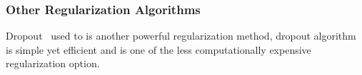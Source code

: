 \subsubsection{Other Regularization Algorithms}

Dropout~\cite{JMLR:v15:srivastava14a} used to is another powerful regularization method, dropout algorithm is simple yet efficient and is one of the less computationally expensive regularization option. 